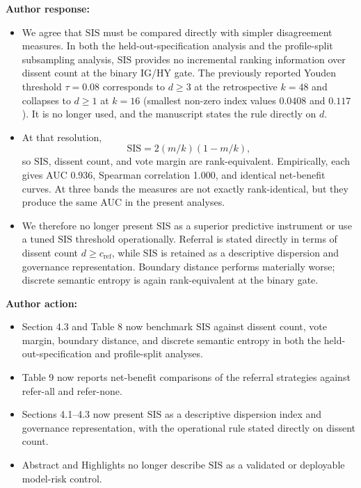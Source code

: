 \documentclass[11pt]{article}
\begin{document}
\textbf{Author response:}

\begin{itemize}
\item We agree that $\mathrm{SIS}$ must be compared directly with simpler disagreement measures. In
both the held-out-specification analysis and the profile-split subsampling analysis,
$\mathrm{SIS}$ provides no incremental ranking information over dissent count at the
binary IG/HY gate. The previously reported Youden threshold $\tau=0.08$ corresponds to
$d\ge3$ at the retrospective $k=48$ and collapses to $d\ge1$ at $k=16$ (smallest non-zero index
values $0.0408$ and $0.117$). It is no longer used, and the manuscript states the rule directly
on $d$.
\item At that resolution,
\[
\mathrm{SIS}=2(m/k)(1-m/k),
\]
so $\mathrm{SIS}$, dissent count, and vote margin are rank-equivalent. Empirically, each gives AUC
0.936, Spearman correlation 1.000, and identical net-benefit curves. At three bands the measures
are not exactly rank-identical, but they produce the same AUC in the present analyses.
\item We therefore no longer present $\mathrm{SIS}$ as a superior predictive instrument or use a tuned
$\mathrm{SIS}$ threshold operationally. Referral is stated directly in terms of dissent count
$d \ge c_{\mathrm{ref}}$, while $\mathrm{SIS}$ is retained as a descriptive dispersion and
governance representation. Boundary distance performs materially worse; discrete semantic entropy
is again rank-equivalent at the binary gate.
\end{itemize}

\textbf{Author action:}

\begin{itemize}
\item Section 4.3 and Table 8 now benchmark $\mathrm{SIS}$ against dissent count, vote
margin, boundary distance, and discrete semantic entropy in both the held-out-specification and
profile-split analyses.
\item Table 9 now reports net-benefit comparisons of the referral strategies against
refer-all and refer-none.
\item Sections 4.1--4.3 now present $\mathrm{SIS}$ as a descriptive dispersion index and
governance representation, with the operational rule stated directly on dissent count.
\item Abstract and Highlights no longer describe $\mathrm{SIS}$ as a validated or deployable
model-risk control.
\end{itemize}
\end{document}
